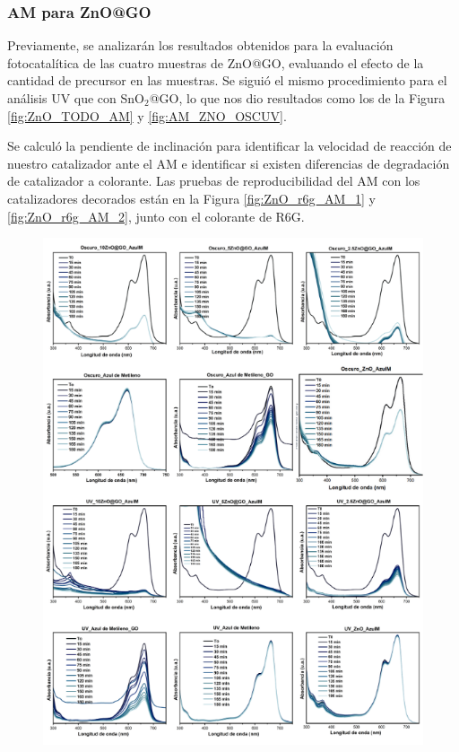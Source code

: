 \documentclass[12pt]{article}
\begin{document}
\subsubsection{AM para ZnO@GO}
Previamente, se analizarán los resultados obtenidos para la evaluación fotocatalítica de las cuatro muestras de ZnO@GO, evaluando el efecto de la cantidad de precursor en las muestras. Se siguió el mismo procedimiento para el análisis UV que con SnO$\displaystyle _{2}$@GO, lo que nos dio resultados como los de la Figura \ref{fig:ZnO_TODO_AM} y \ref{fig:AM_ZNO_OSCUV}. \vspace{1em} %

Se calculó la pendiente de inclinación para identificar la velocidad de reacción de nuestro catalizador ante el AM e identificar si existen diferencias de degradación de catalizador a colorante. Las pruebas de reproducibilidad del AM con los catalizadores decorados están en la Figura \ref{fig:ZnO_r6g_AM_1} y \ref{fig:ZnO_r6g_AM_2}, junto con el colorante de R6G. 


\begin{figure}[H]
    	   \begin{center}
     	  	\includegraphics[width = 1\textwidth]{Imagenes/AM_ZnO_uv_osc.png}
    	   \end{center} 
        \end{figure}
        
\end{document}

